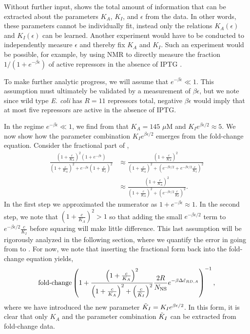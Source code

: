 Without further input, \fref[SIfig5] shows the total amount of
information that can be extracted about the parameters $K_A$, $K_I$, and
$\epsilon$ from the data. In other words, these parameters cannot be
individually fit, instead only the relations $K_A(\epsilon)$ and $K_I(\epsilon)$
can be learned. Another experiment would have to be conducted to independently
measure $\epsilon$ and thereby fix $K_A$ and $K_I$. Such an experiment would be
possible, for example, by using NMR to directly measure the fraction
$1/(1+e^{-\beta\epsilon})$ of active repressors in the absence of IPTG
\cite{Gardino2003, Boulton2016}.

To make further analytic progress, we will assume that $e^{- \beta \epsilon} \ll
1$. This assumption must ultimately be validated by a measurement of $\beta
\epsilon$, but we note since wild type \textit{E. coli} has $R=11$ repressors
total, negative $\beta \epsilon$ would imply that at most five repressors are
active in the absence of IPTG.

In the regime $e^{- \beta \epsilon} \ll
1$, we find from \fref[SIfig5] that $K_A = 145\,\,\mu\text{M}$ and $K_I e^{\beta \epsilon/2} \approx 5$. We now show how the parameter combination $K_I e^{\beta \epsilon/2}$ emerges from the fold-change equation. Consider the fractional part of \eref[SIFullFoldChangeExpression],
\begin{align}
\frac{\left(1+\frac{c}{K_A}\right)^2 \left( 1 + e^{-\beta \epsilon} \right)}{\left(1+\frac{c}{K_A}\right)^2+e^{-\beta \epsilon}\left(1 + \frac{c}{K_I}\right)^2}
&\approx 
\frac{\left(1+\frac{c}{K_A}\right)^2}{\left(1+\frac{c}{K_A}\right)^2+\left(e^{-\beta \epsilon/2} + e^{-\beta \epsilon/2}\frac{c}{K_I}\right)^2} \label{eqSIstep2}\\
&\approx
\frac{\left(1+\frac{c}{K_A}\right)^2}{\left(1+\frac{c}{K_A}\right)^2+\left( e^{-\beta \epsilon/2}\frac{c}{K_I}\right)^2}.\label{eqSIstep3}
\end{align}
In the first step we approximated the numerator as $1 + e^{-\beta \epsilon}
\approx 1$. In the second step, we note that $\left(1+\frac{c}{K_A}\right)^2 >
1$ so that adding the small $e^{-\beta \epsilon/2}$ term to $e^{-\beta
	\epsilon/2}\frac{c}{K_I}$ before squaring will make little difference. This last
assumption will be rigorously analyzed in the following section, where we
quantify the error in going from \eref[eqSIstep2] to \eref[eqSIstep3]. For now,
we note that inserting the fractional form \eref[eqSIstep3] back into the
fold-change equation \eref[SIFullFoldChangeExpression] yields,
\begin{equation} \label{SIFullFoldChangeExpressionSloppiless}
\operatorname{fold-change} \left(
1+\frac{\left(1+\frac{c}{K_A}\right)^2}{\left(1+\frac{c}{K_A}\right)^2+\left(\frac{c}{\tilde{K}_I}\right)^2}\frac{2 R}{N_{\text{NS}}}e^{-\beta \Delta\tilde{\varepsilon}_{RD,A}} \right)^{-1},
\end{equation}
where we have introduced the new parameter $\tilde{K}_I = K_I e^{\beta \epsilon/2}$. In this form, it is clear that only $K_A$ and the parameter combination $\tilde{K}_I$ can be extracted from fold-change data.


